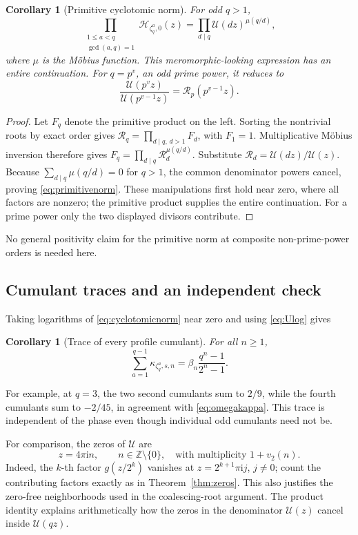 \documentclass[11pt,letterpaper]{article}
\numberwithin{equation}{section}
\newtheorem{corollary}[theorem]{Corollary}
\theoremstyle{definition}
\theoremstyle{remark}
\newcommand{\Z}{\mathbb Z}
\newcommand{\ii}{\mathrm i}
\newcommand{\Up}{\mathcal U}
\newcommand{\Rp}{\mathcal R}
\newcommand{\Hp}{\mathcal H}
\begin{document}
\begin{corollary}[Primitive cyclotomic norm]
For odd \(q>1\),
\begin{equation}
 \prod_{\substack{1\leq a<q\\\gcd(a,q)=1}}\Hp_{\zeta_q^a,0}(z)
 =\prod_{d\mid q}\Up(dz)^{\mu(q/d)},
 \label{eq:primitivenorm}
\end{equation}
where \(\mu\) is the M\"obius function. This meromorphic-looking expression has an entire continuation. For \(q=p^v\), an odd prime power, it reduces to
\begin{equation}
 \frac{\Up(p^vz)}{\Up(p^{v-1}z)}=\Rp_p(p^{v-1}z).
\end{equation}
\end{corollary}
\begin{proof}
Let \(F_q\) denote the primitive product on the left. Sorting the nontrivial roots by exact order gives
\(\Rp_q=\prod_{d\mid q,\,d>1}F_d\), with \(F_1=1\).
Multiplicative M\"obius inversion therefore gives
\(F_q=\prod_{d\mid q}\Rp_d^{\mu(q/d)}\).
Substitute \(\Rp_d=\Up(dz)/\Up(z)\). Because \(\sum_{d\mid q}\mu(q/d)=0\) for \(q>1\), the common denominator powers cancel, proving \eqref{eq:primitivenorm}. These manipulations first hold near zero, where all factors are nonzero; the primitive product supplies the entire continuation. For a prime power only the two displayed divisors contribute.
\end{proof}
No general positivity claim for the primitive norm at composite non-prime-power orders is needed here.

\subsection{Cumulant traces and an independent check}
Taking logarithms of \eqref{eq:cyclotomicnorm} near zero and using \eqref{eq:Ulog} gives
\begin{corollary}[Trace of every profile cumulant]
For all \(n\geq1\),
\begin{equation}
 \sum_{a=1}^{q-1}\kappa_{\zeta_q^a,s,n}
 =\beta_n\frac{q^n-1}{2^n-1}.
 \label{eq:cumulanttrace}
\end{equation}
\end{corollary}
For example, at \(q=3\), the two second cumulants sum to \(2/9\), while the fourth cumulants sum to \(-2/45\), in agreement with \eqref{eq:omegakappa}. This trace is independent of the phase even though individual odd cumulants need not be.

For comparison, the zeros of \(\Up\) are
\begin{equation}
 z=4\pi\ii n,\qquad n\in\Z\setminus\{0\},
 \quad\text{with multiplicity }1+v_2(n).
 \label{eq:Uzeros}
\end{equation}
Indeed, the \(k\)-th factor \(g(z/2^k)\) vanishes at \(z=2^{k+1}\pi\ii j\), \(j\ne0\); count the contributing factors exactly as in Theorem~\ref{thm:zeros}. This also justifies the zero-free neighborhoods used in the coalescing-root argument. The product identity explains arithmetically how the zeros in the denominator \(\Up(z)\) cancel inside \(\Up(qz)\).
\end{document}
